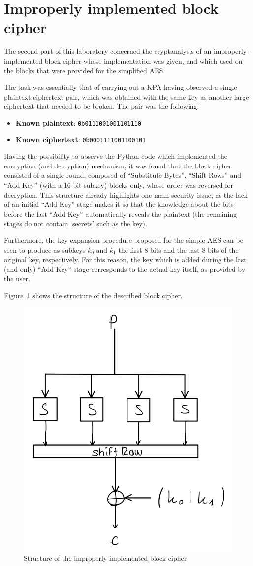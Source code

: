 \documentclass[12pt]{article}
\begin{document}
\section{Improperly implemented block cipher}
\label{sec:03}

The second part of this laboratory concerned the cryptanalysis of an improperly-implemented block cipher whose implementation was given, and which used on the blocks that were provided for the simplified AES.\@

The task was essentially that of carrying out a KPA having observed a single plaintext-ciphertext pair, which was obtained with the same key as another large ciphertext that needed to be broken.
The pair was the following:

\begin{itemize}
   \item \textbf{Known plaintext}: \verb|0b0111001001101110|
   \item \textbf{Known ciphertext}: \verb|0b0001111001100101| 
\end{itemize}

Having the possibility to observe the Python code which implemented the encryption (and decryption) mechanism, it was found that the block cipher consisted of a single round, composed of ``Substitute Bytes'', ``Shift Rows'' and ``Add Key'' (with a 16-bit subkey) blocks only, whose order was reversed for decryption.
This structure already highlights one main security issue, as the lack of an initial ``Add Key'' stage makes it so that the knowledge about the bits before the last ``Add Key'' automatically reveals the plaintext (the remaining stages do not contain `secrets' such as the key).

Furthermore, the key expansion procedure proposed for the simple AES can be seen to produce as subkeys $k_0$ and $k_1$ the first 8 bits and the last 8 bits of the original key, respectively. 
For this reason, the key which is added during the last (and only) ``Add Key'' stage corresponds to the actual key itself, as provided by the user.

Figure~\ref{fig:3.1} shows the structure of the described block cipher.

\begin{figure} [ht]
   \centering
   \includegraphics[width = .5\linewidth]{improper_block_scheme.jpeg}
   \caption{Structure of the improperly implemented block cipher}
   \label{fig:3.1}
\end{figure}
\end{document}
